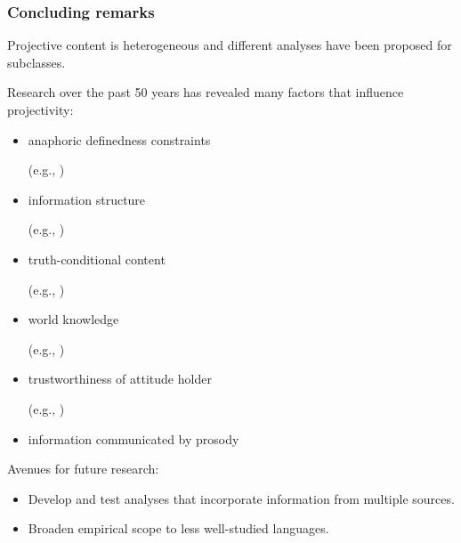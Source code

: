 \documentclass[pdf,xcolor=table,envcountsect,handout]{beamer}
\begin{document}
\begin{frame}
\frametitle{Concluding remarks}


Projective content is heterogeneous and different analyses have been proposed for subclasses.

\medskip

Research over the past 50 years has revealed many factors that influence projectivity:

\begin{itemize}[topsep=-2ex,itemsep=-1pt]

\item anaphoric definedness constraints \hfill \begin{tiny} (e.g., \citealt{heim83,vds92}) \end{tiny}

\item information structure \hfill \begin{tiny} (e.g., \citealt{beaver-belly,tbd-variability}) \end{tiny}

\item truth-conditional content  \hfill \begin{tiny} (e.g., \citealt{karttunen71b,tbd-variability}) \end{tiny}

\item world knowledge  \hfill \begin{tiny} (e.g., \citealt{tonhauser-etal-eval,degen-tonhauser-prior}) \end{tiny}


\item trustworthiness of attitude holder \hfill \begin{tiny} (e.g., \citealt{schlenker10,spector-egre2015}) \end{tiny}

\item information communicated by prosody

\end{itemize}

\bigskip
\pause

Avenues for future research:

\begin{itemize}[topsep=-2ex,itemsep=-1pt]

\item Develop and test analyses that incorporate information from multiple sources.

\item Broaden empirical scope to less well-studied languages.

\end{itemize}


\end{frame}
\end{document}
